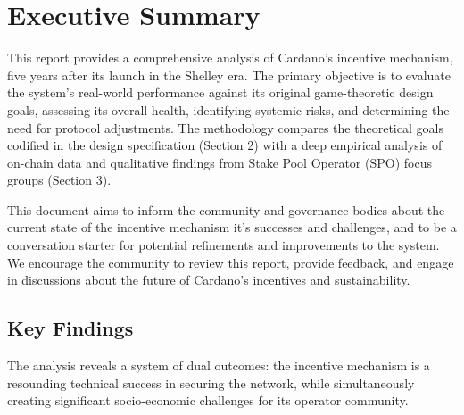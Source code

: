 \documentclass[11pt, letterpaper]{article}
\begin{document}

\section*{Executive Summary}

This report provides a comprehensive analysis of Cardano's incentive mechanism, five years after its 
launch in the Shelley era. The primary objective is to evaluate the system's real-world performance 
against its original game-theoretic design goals, assessing its overall health, identifying systemic 
risks, and determining the need for protocol adjustments. The methodology compares the theoretical goals 
codified in the design specification (Section 2) with a deep empirical analysis of on-chain data and 
qualitative findings from Stake Pool Operator (SPO) focus groups (Section 3). 

This document aims to inform the community and governance bodies about the current state of the incentive mechanism 
it's successes and challenges, and to be a conversation starter for potential refinements and improvements to the system. 
We encourage the community to review this report, provide feedback, and engage in discussions about the future of Cardano's incentives
and sustainability.

\subsection*{Key Findings}

The analysis reveals a system of dual outcomes: the incentive mechanism is a resounding technical 
success in securing the network, while simultaneously creating significant socio-economic challenges 
for its operator community.
\end{document}
